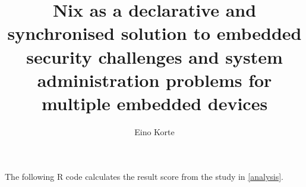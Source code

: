\documentclass[language=english,version=final,mainfont=none,sharelatex=false]{utuftthesis}
\providecommand{\algorithmname}{Algoritmi}
\begin{document}
\title{Nix as a declarative and synchronised solution to embedded security challenges and system administration problems for multiple embedded devices}
\author{Eino Korte}

\maketitle


\tableofcontents

\listoffigures

\listoftables

\listofacronyms

\renewcommand{\algorithmname}{\listingscaption}


\begin{comment}
To better organize things, create a new tex file for each chapter
and input it below.

Avoid using the å, ä, ö or <space> characters in referred names and
underscores \_ in file names (may break hyperref).

Good luck!
\end{comment}

    

%
%


\printbibliography

\begin{comment}
Important! Create the appendix chapters with command \textbackslash appchapter\{some
name\} instead of \textbackslash chapter\{some name\} for the automagic
page counting to work!
\end{comment}


 \label{pomdpappenix}

The following R code calculates the result score from the study in \ref{analysis}.
\end{document}
